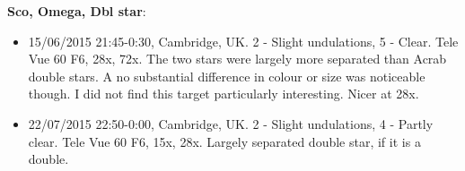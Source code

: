 {\bf Sco, Omega, Dbl star}:
\begin{itemize}
\item 15/06/2015 21:45-0:30, Cambridge, UK. 2 - Slight undulations, 5 - Clear. Tele Vue 60 F6, 28x, 72x. The two stars were largely more separated than Acrab double stars. A no substantial difference in colour or size was noticeable though. I did not find this target particularly interesting. Nicer at 28x.
\item 22/07/2015 22:50-0:00, Cambridge, UK. 2 - Slight undulations, 4 - Partly clear. Tele Vue 60 F6, 15x, 28x. Largely separated double star, if it is a double.
\end{itemize}

